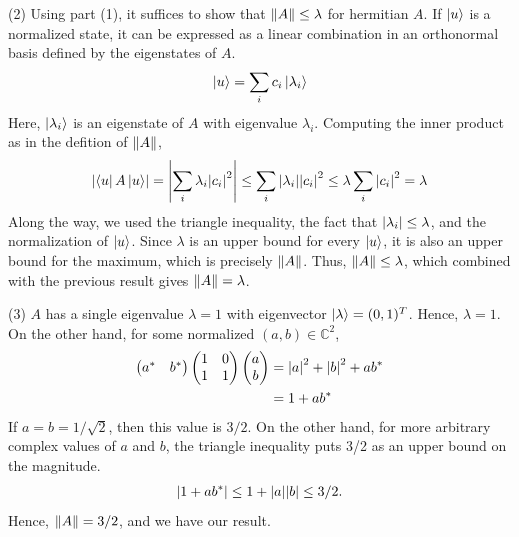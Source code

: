 \documentclass{book}
\begin{document}
    (2) Using part (1), it suffices to show that $\norm{A} \leq \lambda$ for hermitian $A$. If $\ket{u}$ is a normalized state, it can be expressed as a linear combination in an orthonormal basis defined by the eigenstates of $A$.
    \begin{align}
        \ket{u} = \sum_i c_i\ket{\lambda_i}
    \end{align}
    Here, $\ket{\lambda_i}$ is an eigenstate of $A$ with eigenvalue $\lambda_i$. Computing the inner product as in the defition of $\norm{A}$,
    \begin{align}
        \abs{\bra{u}A\ket{u}} = \abs{\sum_i \lambda_i \abs{c_i}^2} \leq \sum_i \abs{\lambda_i}\abs{c_i}^2 \leq \lambda \sum_i \abs{c_i}^2 =\lambda
    \end{align}
    Along the way, we used the triangle inequality, the fact that $\abs{\lambda_i}\leq \lambda$, and the normalization of $\ket{u}$. Since $\lambda$ is an upper bound for every $\ket{u}$, it is also an upper bound for the maximum, which is precisely $\norm{A}$. Thus, $\norm{A}\leq \lambda$, which combined with the previous result gives $\norm{A} = \lambda$.
    
    (3) $A$ has a single eigenvalue $\lambda = 1$ with eigenvector $\ket{\lambda} = (0,1)^T$. Hence, $\lambda =1$. On the other hand, for some normalized $(a,b)\in \mathbb{C}^2$,
    \begin{align}
        \begin{pmatrix}
            a^* & b^*
        \end{pmatrix}
        \begin{pmatrix}
            1 & 0 \\
            1 & 1
        \end{pmatrix}
        \begin{pmatrix}
            a \\
            b
        \end{pmatrix} &= \abs{a}^2 + \abs{b}^2 + a b^* \\
        &= 1 + a b^*
    \end{align}
    If $a = b = 1/\sqrt{2}$, then this value is $3/2$. On the other hand, for more arbitrary complex values of $a$ and $b$, the triangle inequality puts 3/2 as an upper bound on the magnitude.
    \begin{align}
        \abs{1 + a b^*} \leq 1 + \abs{a}\abs{b} \leq 3/2.
    \end{align}
    Hence, $\norm{A} = 3/2$, and we have our result.
    
\end{document}
